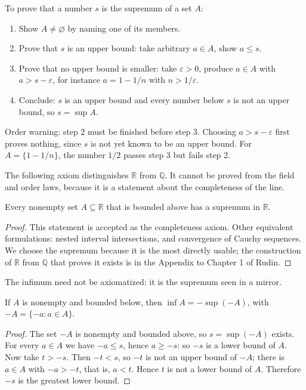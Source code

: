 \begin{resep}
To prove that a number $s$ is the supremum of a set $A$:
\begin{enumerate}
\item Show $A\neq\varnothing$ by naming one of its members.
\item Prove that $s$ is an upper bound: take arbitrary $a\in A$, show $a\le s$.
\item Prove that no upper bound is smaller: take $\varepsilon>0$, produce
      $a\in A$ with $a>s-\varepsilon$, for instance $a=1-1/n$ with $n>1/\varepsilon$.
\item Conclude: $s$ is an upper bound and every number below $s$ is not an upper bound,
      so $s=\sup A$.
\end{enumerate}
Order warning: step 2 must be finished before step 3. Choosing $a>s-\varepsilon$ first
proves nothing, since $s$ is not yet known to be an upper bound. For
$A=\{1-1/n\}$, the number $1/2$ passes step 3 but fails step 2.
\end{resep}

The following axiom distinguishes $\mathbb{R}$ from $\mathbb{Q}$. It cannot be proved
from the field and order laws, because it is a statement about the completeness of the
line.

\begin{teorema}
Every nonempty set $A\subseteq\mathbb{R}$ that is bounded above has a supremum in
$\mathbb{R}$.
\end{teorema}

\begin{proof}[Proof]
This statement is accepted as the completeness axiom. Other equivalent formulations:
nested interval intersections, and convergence of Cauchy sequences. We choose the
supremum because it is the most directly usable; the construction of $\mathbb{R}$ from
$\mathbb{Q}$ that proves it exists is in the Appendix to Chapter 1 of Rudin.
\end{proof}

The infimum need not be axiomatized: it is the supremum seen in a mirror.

\begin{proposisi}
If $A$ is nonempty and bounded below, then $\inf A=-\sup(-A)$, with
$-A=\{-a: a\in A\}$.
\end{proposisi}

\begin{proof}
The set $-A$ is nonempty and bounded above, so $s=\sup(-A)$ exists. For every
$a\in A$ we have $-a\le s$, hence $a\ge -s$: so $-s$ is a lower bound of $A$. Now
take $t>-s$. Then $-t<s$, so $-t$ is not an upper bound of $-A$; there is $a\in A$
with $-a>-t$, that is, $a<t$. Hence $t$ is not a lower bound of $A$. Therefore $-s$
is the greatest lower bound.
\end{proof}

